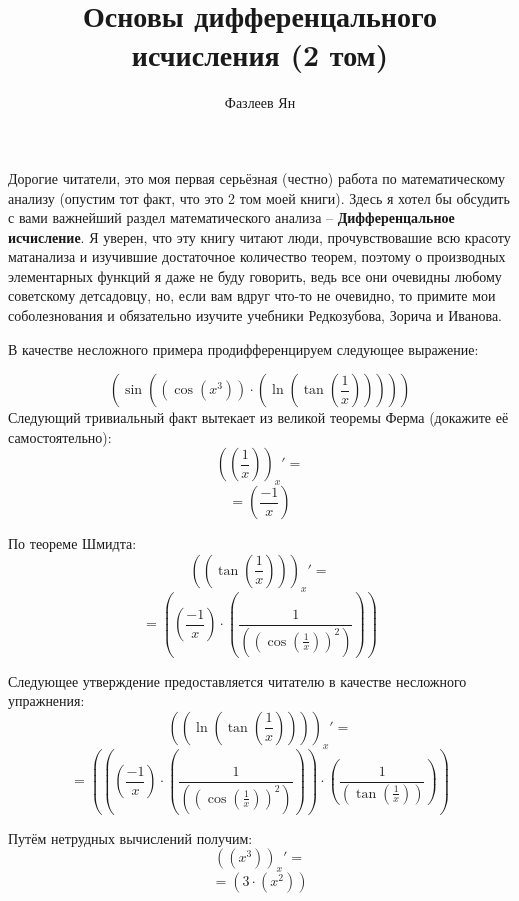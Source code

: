 \documentclass[12pt, a4paper]{article}
\title{Основы дифференцального исчисления (2 том)}
\author{Фазлеев Ян}
\begin{document}
\maketitle
\setlength{\parindent}{0pt}
\large

\hspace{1cm}Дорогие читатели, это моя первая серьёзная (честно) работа по математическому анализу (опустим тот факт, что это 2 том моей книги). Здесь я хотел бы обсудить с вами важнейший раздел математического анализа -- \textbf{Дифференцальное исчисление}. Я уверен, что эту книгу читают люди, прочувствовашие всю красоту матанализа и изучившие достаточное количество теорем, поэтому о производных элементарных функций я даже не буду говорить, ведь все они очевидны любому советскому детсадовцу, но, если вам вдруг что-то не очевидно, то примите мои соболезнования и обязательно изучите учебники Редкозубова, Зорича и Иванова.\vspace{0.5cm}

\hspace{1cm}В качестве несложного примера продифференцируем следующее выражение:

$$  (  \sin  (  {  (  \cos  (  {  {x}  }  ^  {  {  3}  }  )  )  }  \cdot {  (  \ln  (  \tan  (  \frac {  {  1}  }  {  {x}  }  )  )  )  }  )  )  $$
\hspace{1cm}Следующий тривиальный факт вытекает из великой теоремы Ферма (докажите её самостоятельно):
$$ ( (  \frac {  {  1}  }  {  {x}  }  ) )_{x}' = $$
$$ =  (  \frac {  { -1}  }  {  {x}  }  )  $$

\hspace{1cm}По теореме Шмидта:
$$ ( (  \tan  (  \frac {  {  1}  }  {  {x}  }  )  ) )_{x}' = $$
$$ =  (  {  (  \frac {  { -1}  }  {  {x}  }  )  }  \cdot {  (  \frac {  {  1}  }  {  (  {  (  \cos  (  \frac {  {  1}  }  {  {x}  }  )  )  }  ^  {  {  2}  }  )  }  )  }  )  $$

\hspace{1cm}Следующее утверждение предоставляется читателю в качестве несложного упражнения:
$$ ( (  \ln  (  \tan  (  \frac {  {  1}  }  {  {x}  }  )  )  ) )_{x}' = $$
$$ =  (  {  (  {  (  \frac {  { -1}  }  {  {x}  }  )  }  \cdot {  (  \frac {  {  1}  }  {  (  {  (  \cos  (  \frac {  {  1}  }  {  {x}  }  )  )  }  ^  {  {  2}  }  )  }  )  }  )  }  \cdot {  (  \frac {  {  1}  }  {  (  \tan  (  \frac {  {  1}  }  {  {x}  }  )  )  }  )  }  )  $$

\hspace{1cm}Путём нетрудных вычислений получим:
$$ ( (  {  {x}  }  ^  {  {  3}  }  ) )_{x}' = $$
$$ =  (  {  {  3}  }  \cdot {  (  {  {x}  }  ^  {  {  2}  }  )  }  )  $$
\end{document}
